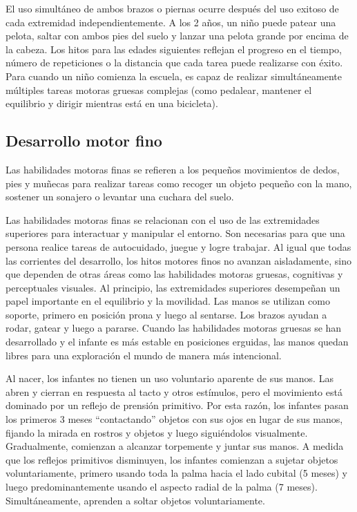 \documentclass[11pt,letterpaper]{report}
\begin{document}
El uso simultáneo de ambos brazos o piernas ocurre después del uso exitoso de
cada extremidad independientemente. A los 2 años, un niño puede patear una
pelota, saltar con ambos pies del suelo y lanzar una pelota grande por encima
de la cabeza. Los hitos para las edades siguientes reflejan el progreso en el
tiempo, número de repeticiones o la distancia que cada tarea puede realizarse
con éxito. Para cuando un niño comienza la escuela, es capaz de realizar
simultáneamente múltiples tareas motoras gruesas complejas (como pedalear,
mantener el equilibrio y dirigir mientras está en una bicicleta).
\cite{Gerber2010}

\subsection{Desarrollo motor fino}
Las habilidades motoras finas se refieren a los pequeños movimientos de dedos,
pies y muñecas para realizar tareas como recoger un objeto pequeño con la mano,
sostener un sonajero o levantar una cuchara del suelo. \cite{Panda2021}

Las habilidades motoras finas se relacionan con el uso de las extremidades
superiores para interactuar y manipular el entorno. Son necesarias para que una
persona realice tareas de autocuidado, juegue y logre trabajar. Al igual que
todas las corrientes del desarrollo, los hitos motores finos no avanzan
aisladamente, sino que dependen de otras áreas como las habilidades motoras
gruesas, cognitivas y perceptuales visuales. Al principio, las extremidades
superiores desempeñan un papel importante en el equilibrio y la movilidad. Las
manos se utilizan como soporte, primero en posición prona y luego al sentarse.
Los brazos ayudan a rodar, gatear y luego a pararse. Cuando las habilidades
motoras gruesas se han desarrollado y el infante es más estable en posiciones
erguidas, las manos quedan libres para una exploración el mundo de manera más
intencional. \cite{Gerber2010}

Al nacer, los infantes no tienen un uso voluntario aparente de sus manos. Las
abren y cierran en respuesta al tacto y otros estímulos, pero el movimiento
está dominado por un reflejo de prensión primitivo. Por esta razón, los
infantes pasan los primeros 3 meses ``contactando'' objetos con sus ojos en
lugar de sus manos, fijando la mirada en rostros y objetos y luego siguiéndolos
visualmente. Gradualmente, comienzan a alcanzar torpemente y juntar sus manos.
A medida que los reflejos primitivos disminuyen, los infantes comienzan a
sujetar objetos voluntariamente, primero usando toda la palma hacia el lado
cubital (5 meses) y luego predominantemente usando el aspecto radial de la
palma (7 meses). Simultáneamente, aprenden a soltar objetos voluntariamente.
\cite{Gerber2010}
\end{document}

